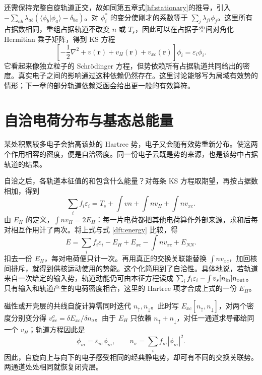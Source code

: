 还需保持完整自旋轨道正交，故如同第五章式\eqref{hf:stationary}的推导，引入 $-\sum_{ab}\lambda_{ab}(\langle\phi_b|\phi_a\rangle-\delta_{ba})$。对 $\phi_i^*$ 的变分使刚才的系数等于 $\sum_j\lambda_{ji}\phi_j$。这里所有占据数相同，重组占据轨道不改变 $n$ 或 $T_s$，因此可以在占据子空间对角化 Hermitian 乘子矩阵，得到 KS 方程
\begin{equation}\label{dft:ks}
\left[-\frac12\nabla^2+v(\bm r)+v_H(\bm r)+v_{xc}(\bm r)\right]\phi_i
=\varepsilon_i\phi_i.
\end{equation}
它看起来像独立粒子的 Schrödinger 方程，但势依赖所有占据轨道共同给出的密度。真实电子之间的影响通过这种依赖仍然存在。这里讨论能够写为局域有效势的情形；下一章的部分轨道依赖泛函会给出更一般的有效算符。

\section{自洽电荷分布与基态总能量}
某处积累较多电子会抬高该处的 Hartree 势，电子又会随有效势重新分布。使这两个作用相容的密度，便是自洽密度。同一份电子云既是势的来源，也是该势中占据轨道的结果。

自洽之后，各轨道本征值的和包含什么能量？对每条 KS 方程取期望，再按占据数相加，得到
\begin{equation}
\sum_i f_i\varepsilon_i=T_s+\int vn+\int nv_H+\int nv_{xc}.
\end{equation}
由 $E_H$ 的定义，$\int nv_H=2E_H$：每一片电荷都把其他电荷算作外部来源，求和后每对相互作用计了两次。将上式与式 \eqref{dft:energy} 比较，得
\begin{equation}
E=\sum_i f_i\varepsilon_i-E_H+E_{xc}-\int nv_{xc}+E_{NN}.
\end{equation}
扣去一份 $E_H$，每对电荷便只计一次。再用真正的交换关联能替换 $\int nv_{xc}$，加回核间排斥，就得到供核运动使用的势能。这个化简用到了自洽性。具体地说，若轨道来自一次给定的输入势，轨道动能仍可由本征方程读成 $\sum_i f_i\varepsilon_i-\int v_s[n_{\rm in}]n_{\rm out}$。只有输入和轨道产生的电荷密度相合，这里的 Hartree 项才合成上式的一份 $E_H$。

磁性或开壳层的共线自旋计算需同时迭代 $n_\uparrow,n_\downarrow$。此时写
$E_{xc}[n_\uparrow,n_\downarrow]$，对两个密度分别变分得
$v_{xc}^\sigma=\delta E_{xc}/\delta n_\sigma$。由于 $E_H$ 只依赖 $n_\uparrow+n_\downarrow$，对任一通道求导都给同一个 $v_H$；轨道方程因此是
\begin{equation}
[-\nabla^2/2+v+v_H+v_{xc}^\sigma]\phi_{i\sigma}
=\varepsilon_{i\sigma}\phi_{i\sigma},\qquad
n_\sigma=\sum_i f_{i\sigma}|\phi_{i\sigma}|^2.
\end{equation}
因此，自旋向上与向下的电子感受相同的经典静电势，却可有不同的交换关联势。两通道处处相同就恢复闭壳层。

